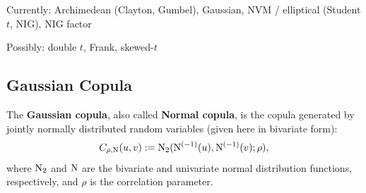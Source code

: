 

Currently: Archimedean (Clayton, Gumbel), Gaussian, NVM / elliptical
(Student $t$, NIG), NIG factor

Possibly: double $t$, Frank, skewed-$t$



\subsection{Gaussian Copula}\label{subsec:Gaussian-copula}

The {\bf Gaussian copula}, also called {\bf Normal
    copula}, is the copula generated by jointly normally
  distributed random variables (given here in bivariate form):
\begin{equation*}
  C_{\rho,{\rm N}}(u,v) := {\rm N}_2({\rm N}^{(-1)}(u), {\rm N}^{(-1)}(v);
  \rho), 
\end{equation*}
where ${\rm N}_2$ and ${\rm N}$ are the bivariate and univariate normal
distribution functions, respectively, and $\rho $ is the correlation
parameter. 
